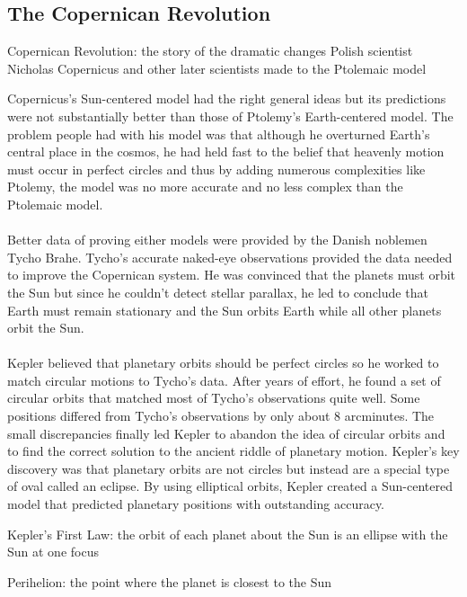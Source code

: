 \documentclass[12pt]{article}
\begin{document}
\subsection{The Copernican Revolution} 
\begin{definition} Copernican Revolution: the story of the dramatic changes Polish scientist Nicholas Copernicus and other later scientists made to the Ptolemaic model \end{definition} 
Copernicus's Sun-centered model had the right general ideas but its predictions were not substantially better than those of Ptolemy's Earth-centered model. The problem people had with his model was that although he overturned Earth's central place in the cosmos, he had held fast to the belief that heavenly motion must occur in perfect circles and thus by adding numerous complexities like Ptolemy, the model was no more accurate and no less complex than the Ptolemaic model. \\~\\
Better data of proving either models were provided by the Danish noblemen Tycho Brahe. Tycho's accurate naked-eye observations provided the data needed to improve the Copernican system. He was convinced that the planets must orbit the Sun but since he couldn't detect stellar parallax, he led to conclude that Earth must remain stationary and the Sun orbits Earth while all other planets orbit the Sun. \\~\\
Kepler believed that planetary orbits should be perfect circles so he worked to match circular motions to Tycho's data. After years of effort, he found a set of circular orbits that matched most of Tycho's observations quite well. Some positions differed from Tycho's observations by only about 8 arcminutes. The small discrepancies finally led Kepler to abandon the idea of circular orbits and to find the correct solution to the ancient riddle of planetary motion. Kepler's key discovery was that planetary orbits are not circles but instead are a special type of oval called an eclipse. By using elliptical orbits, Kepler created a Sun-centered model that predicted planetary positions with outstanding accuracy. 
\begin{definition} Kepler's First Law: the orbit of each planet about the Sun is an ellipse with the Sun at one focus \end{definition} 
\begin{definition} Perihelion: the point where the planet is closest to the Sun \end{definition} 
\end{document}
